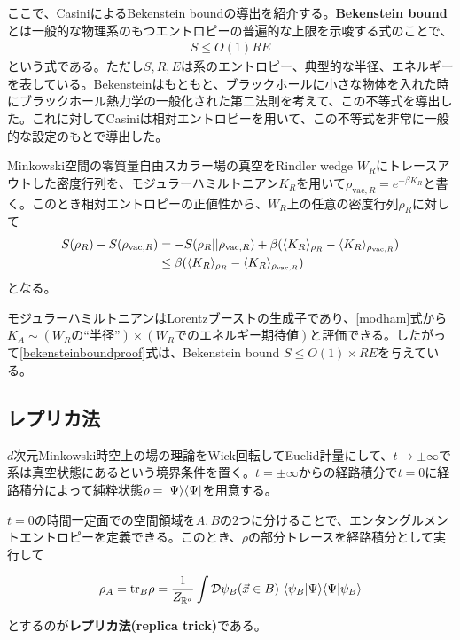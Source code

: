 ここで、Casini\cite{Casini:2008cr}によるBekenstein boundの導出を紹介する。\textbf{Bekenstein bound}\cite{Bekenstein:1980jp}とは一般的な物理系のもつエントロピーの普遍的な上限を示唆する式のことで、
\begin{align}
S\le O(1)RE
\end{align}
という式である。ただし$S,R,E$は系のエントロピー、典型的な半径、エネルギーを表している。Bekensteinはもともと、ブラックホールに小さな物体を入れた時にブラックホール熱力学の一般化された第二法則を考えて、この不等式を導出した。これに対してCasiniは相対エントロピーを用いて、この不等式を非常に一般的な設定のもとで導出した。

Minkowski空間の零質量自由スカラー場の真空をRindler wedge $W_R$にトレースアウトした密度行列を、モジュラーハミルトニアン$K_R$を用いて$\rho_{\text{vac},R}=e^{-\beta K_R}$と書く。このとき相対エントロピーの正値性から、$W_R$上の任意の密度行列$\rho_R$に対して
\begin{align}\label{bekensteinboundproof}
S(\rho_R)-S(\rho_{\text{vac},R})&=-S(\rho_R||\rho_{\text{vac},R})+\beta(\langle K_R \rangle_{\rho_R}-\langle K_R\rangle_{\rho_{\text{vac},R}})\notag\\
&\leq \beta(\langle K_R \rangle_{\rho_R}-\langle K_R\rangle_{\rho_{\text{vac},R}})
\end{align}
となる。

モジュラーハミルトニアンはLorentzブーストの生成子であり、\ref{modham}式から$K_A\sim (W_R\text{の``半径''})\times (W_R\text{でのエネルギー期待値})$と評価できる。したがって\ref{bekensteinboundproof}式は、Bekenstein bound $S\leq O(1)\times RE$を与えている。

\subsection{レプリカ法}
$d$次元Minkowski時空上の場の理論をWick回転してEuclid計量にして、$t\to \pm \infty$で系は真空状態にあるという境界条件を置く。$t=\pm \infty$からの経路積分で$t=0$に経路積分によって純粋状態$\rho=|\Psi\rangle\langle \Psi|$を用意する。

$t=0$の時間一定面での空間領域を$A,B$の$2$つに分けることで、エンタングルメントエントロピーを定義できる。このとき、$\rho$の部分トレースを経路積分として実行して
\begin{oframed}
\begin{align}
\rho_A=\tr_B\rho=\frac{1}{Z_{\R^d}}\int \mathcal{D}\psi_B(\vec{x}\in B)\ \la \psi_B|\Psi\ra\la \Psi|\psi_B\ra
\end{align}
\end{oframed}
とするのが\textbf{レプリカ法(replica trick)}である。

